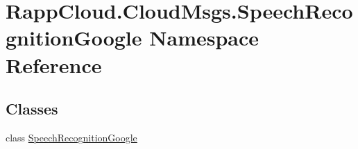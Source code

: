 \hypertarget{namespaceRappCloud_1_1CloudMsgs_1_1SpeechRecognitionGoogle}{\section{Rapp\-Cloud.\-Cloud\-Msgs.\-Speech\-Recognition\-Google Namespace Reference}
\label{namespaceRappCloud_1_1CloudMsgs_1_1SpeechRecognitionGoogle}
}
\subsection*{Classes}
\begin{DoxyCompactItemize}
\item 
class \hyperlink{classRappCloud_1_1CloudMsgs_1_1SpeechRecognitionGoogle_1_1SpeechRecognitionGoogle}{Speech\-Recognition\-Google}
\end{DoxyCompactItemize}
